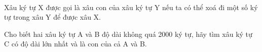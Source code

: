  

Xâu ký tự X được gọi là xâu con của xâu ký tự Y nếu ta có thể xoá đi một số ký tự trong xâu Y để được xâu X.

Cho biết hai xâu ký tự A và B độ dài không quá 2000 ký tự, hãy tìm xâu ký tự C có độ dài lớn nhất và là con của cả A và B.
